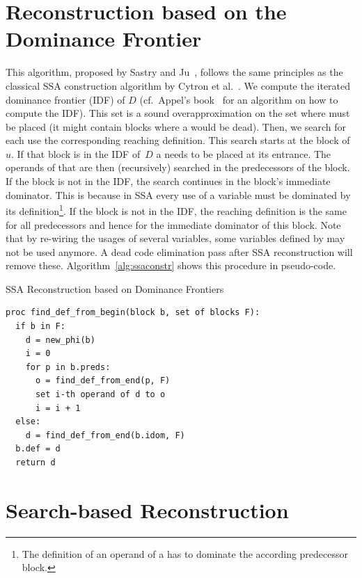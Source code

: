 \section{Reconstruction based on the Dominance Frontier}
This algorithm, proposed by Sastry and Ju~\cite{sastry98}, follows the same principles as the classical SSA construction algorithm by Cytron et al.~\cite{cytron:1991:ssa}.
We compute the iterated dominance frontier (IDF) of $D$ (cf.~Appel's book~\cite{appel:2002:modern} for an algorithm on how to compute the IDF).
This set is a sound overapproximation on the set where \phifuns must be placed (it might contain blocks where a \phifun would be dead).
Then, we search for each use the corresponding reaching definition.
This search starts at the block of~$u$.
If that block is in the IDF of~$D$ a \phifun needs to be placed at its entrance.
The operands of that \phifun are then (recursively) searched in the predecessors of the block.
If the block is not in the IDF, the search continues in the block's immediate dominator. 
This is because in SSA every use of a variable must be dominated by its definition\footnote{The definition of an operand of a \phifun has to dominate the according predecessor block.}.
If the block is not in the IDF, the reaching definition is the same for all predecessors and hence for the immediate dominator of this block.
Note that by re-wiring the usages of several variables, some variables defined by \phifuns may not be used anymore.
A dead code elimination pass after SSA reconstruction will remove these. 
Algorithm~\ref{alg:ssaconstr} shows this procedure in pseudo-code.

\begin{algorithm}
  \caption{SSA Reconstruction based on Dominance Frontiers}
  \label{alg:ssaconstr}
\begin{verbatim}
proc find_def_from_begin(block b, set of blocks F):
  if b in F:
    d = new_phi(b)
    i = 0
    for p in b.preds: 
      o = find_def_from_end(p, F)
      set i-th operand of d to o
      i = i + 1
  else:
    d = find_def_from_end(b.idom, F)
  b.def = d
  return d
\end{verbatim}
\end{algorithm}

\section{Search-based Reconstruction}

